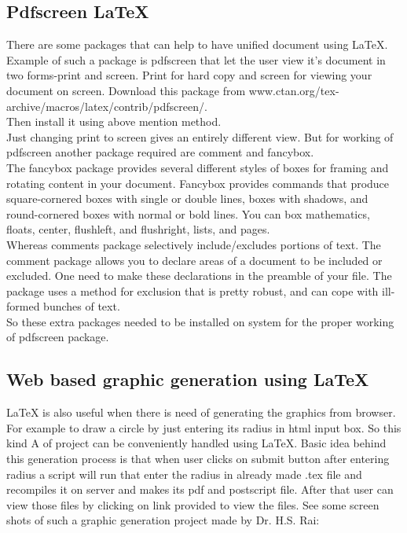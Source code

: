 \subsection{Pdfscreen \LaTeX{}}
There are some packages that can help to have unified document using \LaTeX{}. Example of such a package is pdfscreen that let the user view it’s document in two forms-print and screen. Print for hard copy and screen for viewing your document on screen. Download this package from www.ctan.org/tex-archive/macros/latex/contrib/pdfscreen/.\\
Then install it using above mention method.\\

Just changing print to screen gives an entirely different view. But for working of pdfscreen another package required are comment and fancybox.\\

The fancybox package provides several different styles of boxes for framing and rotating content in your document. Fancybox provides commands that produce square-cornered boxes with single or double lines, boxes with shadows, and round-cornered boxes with normal or bold lines. You can box mathematics, floats, center, flushleft, and flushright, lists, and pages.\\

Whereas comments package selectively include/excludes portions of text. The comment package allows you to declare areas of a document to be included or excluded. One need to make these declarations in the preamble of your file. The package uses a method for exclusion that is pretty robust, and can cope with ill-formed bunches of text.\\

So these extra packages needed to be installed on system for the proper working of pdfscreen package.
\subsection{Web based graphic generation using \LaTeX{}}
\LaTeX{} is also useful when there is need of generating the graphics from browser. For
example to draw a circle by just entering its radius in html input box. So this kind
A
of project can be conveniently handled using \LaTeX{}. Basic idea behind this generation
process is that when user clicks on submit button after entering radius a script will run
that enter the radius in already made .tex file and recompiles it on server and makes its
pdf and postscript file. After that user can view those files by clicking on link provided
to view the files. See some screen shots of such a graphic generation project made by
Dr. H.S. Rai:\\

